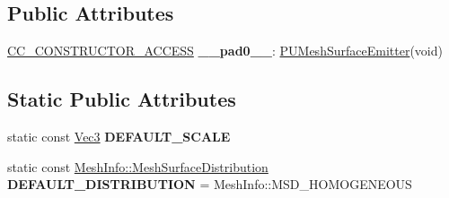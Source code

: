\subsection*{Public Attributes}
\begin{DoxyCompactItemize}
\item 
\mbox{\label{classPUMeshSurfaceEmitter_af53f1ab2b0c4b2106df522e80fdc92d8}} 
\hyperlink{_2cocos2d_2cocos_2base_2ccConfig_8h_a25ef1314f97c35a2ed3d029b0ead6da0}{C\+C\+\_\+\+C\+O\+N\+S\+T\+R\+U\+C\+T\+O\+R\+\_\+\+A\+C\+C\+E\+SS} {\bfseries \+\_\+\+\_\+pad0\+\_\+\+\_\+}\+: \hyperlink{classPUMeshSurfaceEmitter}{P\+U\+Mesh\+Surface\+Emitter}(void)
\end{DoxyCompactItemize}
\subsection*{Static Public Attributes}
\begin{DoxyCompactItemize}
\item 
\mbox{\label{classPUMeshSurfaceEmitter_a5aad8cdb6f8ae0f5adf0e178daa7d7da}} 
static const \hyperlink{classVec3}{Vec3} {\bfseries D\+E\+F\+A\+U\+L\+T\+\_\+\+S\+C\+A\+LE}
\item 
\mbox{\label{classPUMeshSurfaceEmitter_a875a72fa22e95e9610edb8bc1c763de0}} 
static const \hyperlink{classMeshInfo_aadc99105abbc3bd033e33c6ba512a13b}{Mesh\+Info\+::\+Mesh\+Surface\+Distribution} {\bfseries D\+E\+F\+A\+U\+L\+T\+\_\+\+D\+I\+S\+T\+R\+I\+B\+U\+T\+I\+ON} = Mesh\+Info\+::\+M\+S\+D\+\_\+\+H\+O\+M\+O\+G\+E\+N\+E\+O\+US
\end{DoxyCompactItemize}
